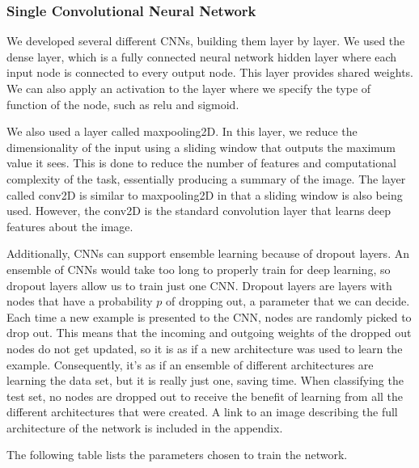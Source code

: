 \documentclass[11pt]{article}
\begin{document}
	\subsubsection{Single Convolutional Neural Network}

	 We developed several different CNNs, building them layer by layer. We used the dense layer, which is a fully connected neural network hidden layer where each input node is connected to every output node. This layer provides shared weights. We can also apply an activation to the layer where we specify the type of function of the node, such as relu and sigmoid. 
	
	 We also used a layer called maxpooling2D. In this layer, we reduce the dimensionality of the input using a sliding window that outputs the maximum value it sees. This is done to reduce the number of features and computational complexity of the task, essentially producing a summary of the image. The layer called conv2D is similar to maxpooling2D in that a sliding window is also being used. However, the conv2D is the standard convolution layer that learns deep features about the image.
	
     Additionally, CNNs can support ensemble learning because of dropout layers. An ensemble of CNNs would take too long to properly train for deep learning, so dropout layers allow us to train just one CNN. Dropout layers are layers with nodes that have a probability $p$ of dropping out, a parameter that we can decide. Each time a new example is presented to the CNN, nodes are randomly picked to drop out. This means that the incoming and outgoing weights of the dropped out nodes do not get updated, so it is as if a new architecture was used to learn the example. Consequently, it's as if an ensemble of different architectures are learning the data set, but it is really just one, saving time. When classifying the test set, no nodes are dropped out to receive the benefit of learning from all the different architectures that were created. A link to an image describing the full architecture of the network is included in the appendix.
      
     The following table lists the parameters chosen to train the network.
     
\end{document}
